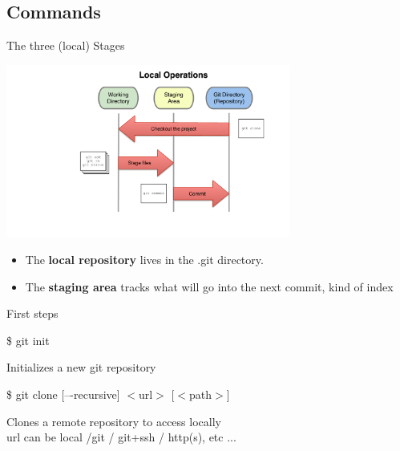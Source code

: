 \documentclass[10pt,xcolor=dvipsnames]{beamer}
\begin{document}
\subsection{Commands}

\begin{frame}{The three (local) Stages}
\begin{center}
\includegraphics[width = 0.7\textwidth]{three_states.pdf}
\end{center}
\begin{itemize}
\item The {\bf local repository} lives in the .git directory.
\item The {\bf staging area} tracks what will go into the next commit, kind of index
\end{itemize}
\end{frame}



\begin{frame}{First steps}
\begin{block}{}
\$ git init
\end{block}
Initializes a new git repository\\[0.4in]

\begin{block}{}
\$ git clone [–-recursive] $<$url$>$ [$<$path$>$]
\end{block}
Clones a remote repository to access locally\\
url can be local /git / git+ssh / http(s), etc ...
\end{frame}
\end{document}
